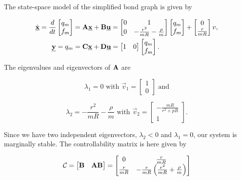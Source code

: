 \documentclass[11pt,titlepage]{report}
\begin{document}
The state-space model of the simplified bond graph is given by

\begin{align}
	\dot{\mathbf{\underline{x}}} = \frac{d}{dt}
	\begin{bmatrix}
		q_m \\
		f_m
	\end{bmatrix} &= \mathbf{A} \mathbf{\underline{x}} + \mathbf{B} \mathbf{\underline{u}} =
	\begin{bmatrix}
		0 & 1 \\
		0 & -\frac{r^2}{m R}-\frac{\rho}{m}
	\end{bmatrix}
	\begin{bmatrix}
		q_m \\
		f_m
	\end{bmatrix} +
	\begin{bmatrix}
		0 \\
		\frac{r}{m R}
	\end{bmatrix} v, \\
	\mathbf{\underline{y}} = q_m &= \mathbf{C} \mathbf{\underline{x}} + \mathbf{D} \mathbf{\underline{u}} =
	\begin{bmatrix}
		1 & 0
	\end{bmatrix}
	\begin{bmatrix}
		q_m \\
		f_m
	\end{bmatrix}.
\end{align}

The eigenvalues and eigenvectors of $\mathbf{A}$ are

\begin{equation}
	\lambda_1 = 0\text{ with }
	\vec{v}_1 = \begin{bmatrix}
		1 \\
		0
	\end{bmatrix}\text{ and}
\end{equation}

\begin{equation}
	\lambda_2 = -\frac{r^2}{m R}-\frac{\rho}{m}\text{ with }
	\vec{v}_2 = \begin{bmatrix}
		-\frac{m R}{r^2 + p R} \\
		1
	\end{bmatrix}.
\end{equation}

Since we have two independent eigenvectors, $\lambda_2 < 0$ and $\lambda_1 = 0$, our system is marginally stable. The controllability matrix is here given by

\begin{equation}
	\mathcal{C} = \begin{bmatrix}
		\mathbf{B} & \mathbf{A} \mathbf{B}
	\end{bmatrix} = \begin{bmatrix}
		0 & \frac{r}{m R} \\
		\frac{r}{m R} & -\frac{r}{m R} \left(\frac{r^2}{m R}+\frac{\rho}{m} \right)
	\end{bmatrix}
\end{equation}
\end{document}
